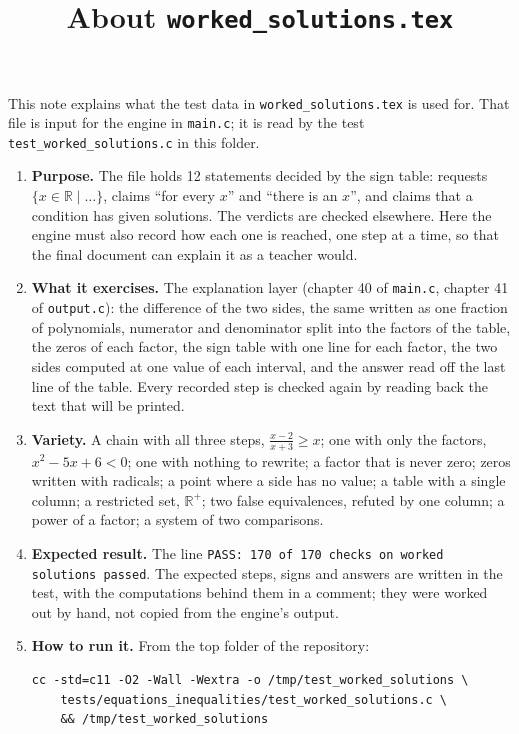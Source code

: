 \documentclass[11pt,a4paper]{article}
\title{About \texttt{worked\_solutions.tex}}
\author{}
\date{}
\begin{document}
\maketitle
This note explains what the test data in \texttt{worked\_solutions.tex} is used for. That file is input for the engine in \texttt{main.c}; it is read by the test \texttt{test\_worked\_solutions.c} in this folder.

\begin{enumerate}
\item \textbf{Purpose.} The file holds 12 statements decided by the sign table: requests $\{x \in \mathbb{R} \mid \ldots\}$, claims ``for every $x$'' and ``there is an $x$'', and claims that a condition has given solutions. The verdicts are checked elsewhere. Here the engine must also record how each one is reached, one step at a time, so that the final document can explain it as a teacher would.

\item \textbf{What it exercises.} The explanation layer (chapter 40 of \texttt{main.c}, chapter 41 of \texttt{output.c}): the difference of the two sides, the same written as one fraction of polynomials, numerator and denominator split into the factors of the table, the zeros of each factor, the sign table with one line for each factor, the two sides computed at one value of each interval, and the answer read off the last line of the table. Every recorded step is checked again by reading back the text that will be printed.

\item \textbf{Variety.} A chain with all three steps, $\frac{x - 2}{x + 3} \ge x$; one with only the factors, $x^{2} - 5x + 6 < 0$; one with nothing to rewrite; a factor that is never zero; zeros written with radicals; a point where a side has no value; a table with a single column; a restricted set, $\mathbb{R}^{+}$; two false equivalences, refuted by one column; a power of a factor; a system of two comparisons.

\item \textbf{Expected result.} The line \texttt{PASS: 170 of 170 checks on worked solutions passed}. The expected steps, signs and answers are written in the test, with the computations behind them in a comment; they were worked out by hand, not copied from the engine's output.

\item \textbf{How to run it.} From the top folder of the repository:
\begin{verbatim}
cc -std=c11 -O2 -Wall -Wextra -o /tmp/test_worked_solutions \
    tests/equations_inequalities/test_worked_solutions.c \
    && /tmp/test_worked_solutions
\end{verbatim}
\end{enumerate}
\end{document}
